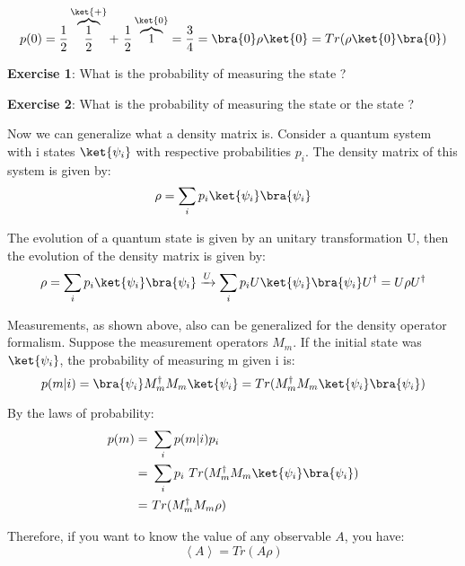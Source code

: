\begin{equation}
    p(0) = \frac{1}{2}\overbrace{\frac{1}{2}}^{\ket{+}} + \  \frac{1}{2}\overbrace{1}^{\ket{0}} = \frac{3}{4} = \bra{0} \rho \ket{0} = Tr(\rho \ket{0} \bra{0})
\end{equation}

 

\textbf{Exercise 1}: What is the probability of measuring the state ?

 

\textbf{Exercise 2}: What is the probability of measuring the state  or the state ?

 

Now we can generalize what a density matrix is. Consider a quantum system with i states $\ket{\psi_i}$ with respective probabilities $p_i$. The density matrix of this system is given by:
\begin{equation}
    \label{Eq: Density Operator}
    \rho = \sum_i p_i \ket{\psi_i}\bra{\psi_i}
\end{equation}

The evolution of a quantum state is given by an unitary transformation U, then the evolution of the density matrix is given by:
\begin{equation}
    \rho = \sum_i p_i \ket{\psi_i}\bra{\psi_i} \xrightarrow{U} \sum_i p_i U\ket{\psi_i}\bra{\psi_i}U^{\dagger} = U \rho U^{\dagger}
\end{equation}

Measurements, as shown above, also can be generalized for the density operator formalism. Suppose the measurement operators $M_m$. If the initial state was $\ket{\psi_i}$, the probability of measuring m given i is:
\begin{equation}
    p(m|i) = \bra{\psi_i} M_m^{\dagger}M_m \ket{\psi_i} = Tr(M_m^{\dagger}M_m \ket{\psi_i}\bra{\psi_i})
\end{equation}

By the laws of probability:
\begin{equation}
    \begin{split}
        p(m) = & \ \sum_i p(m|i) p_i \\
        = & \ \sum_i p_i \ Tr(M_m^{\dagger}M_m \ket{\psi_i}\bra{\psi_i}) \\
        = & \ Tr( M_m^{\dagger}M_m \rho )
    \end{split}
\end{equation}

Therefore, if you want to know the value of any observable $A$, you have:
\begin{equation}
    \left<A\right> = Tr( A \rho )
\end{equation}

